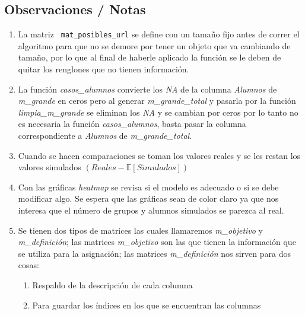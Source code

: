 \begin{appendices}
\chapter{Observaciones / Notas} %

\begin{enumerate}
	\item La matriz \verb+ mat_posibles_url+ se define con un tamaño fijo antes de correr el algoritmo para que no se demore por tener un objeto que va cambiando de tamaño, por lo que al final de haberle aplicado la función se le deben de quitar los renglones que no tienen información.

  \item La función \textit{casos\_alumnos} convierte los \textit{NA} de la columna \textit{Alumnos} de \textit{m\_grande} en ceros pero al generar \textit{m\_grande\_total} y pasarla por la función \textit{limpia\_m\_grande} se eliminan los \textit{NA} y se cambian por ceros por lo tanto no es necesaria la función \textit{casos\_alumnos}, basta pasar la columna correspondiente a \textit{Alumnos} de \textit{m\_grande\_total}.
  
  \item Cuando se hacen comparaciones se toman los valores reales y se les restan los valores simulados $(Reales - \mathbb{E}[Simulados])$

  \item Con las gráficas \textit{heatmap} se revisa si el modelo es adecuado o si se debe modificar algo. Se espera que las gráficas sean de color claro ya que nos interesa que el número de grupos y alumnos simulados se parezca al real.
  
  \item Se tienen dos tipos de matrices las cuales llamaremos \textit{m\_objetivo} y \textit{m\_definición}; las matrices \textit{m\_objetivo} son las que tienen la información que se utiliza para la asignación; las matrices \textit{m\_definición} nos sirven para dos cosas:
  
	\begin{enumerate}
		\item Respaldo de la descripción de cada columna
		
		\item Para guardar los índices en los que se encuentran las columnas
	\end{enumerate}
  
  

\end{enumerate}
\end{appendices}
